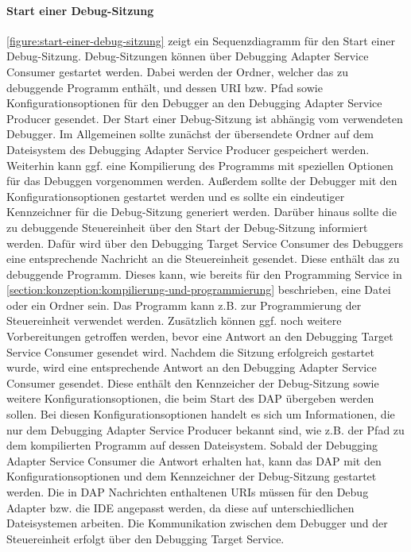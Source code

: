 \paragraph{Start einer Debug-Sitzung} \autoref{figure:start-einer-debug-sitzung} zeigt ein Sequenzdiagramm für den Start einer Debug-Sitzung. Debug-Sitzungen können über Debugging Adapter Service Consumer gestartet werden. Dabei werden der Ordner, welcher das zu debuggende Programm enthält, und dessen URI bzw. Pfad sowie Konfigurationsoptionen für den Debugger an den Debugging Adapter Service Producer gesendet. Der Start einer Debug-Sitzung ist abhängig vom verwendeten Debugger. Im Allgemeinen sollte zunächst der übersendete Ordner auf dem Dateisystem des Debugging Adapter Service Producer gespeichert werden. Weiterhin kann ggf. eine Kompilierung des Programms mit speziellen Optionen für das Debuggen vorgenommen werden. Außerdem sollte der Debugger mit den Konfigurationsoptionen gestartet werden und es sollte ein eindeutiger Kennzeichner für die Debug-Sitzung generiert werden. Darüber hinaus sollte die zu debuggende Steuereinheit über den Start der Debug-Sitzung informiert werden. Dafür wird über den Debugging Target Service Consumer des Debuggers eine entsprechende Nachricht an die Steuereinheit gesendet. Diese enthält das zu debuggende Programm. Dieses kann, wie bereits für den Programming Service in \autoref{section:konzeption:kompilierung-und-programmierung} beschrieben, eine Datei oder ein Ordner sein. Das Programm kann z.B. zur Programmierung der Steuereinheit verwendet werden. Zusätzlich können ggf. noch weitere Vorbereitungen getroffen werden, bevor eine Antwort an den Debugging Target Service Consumer gesendet wird. Nachdem die Sitzung erfolgreich gestartet wurde, wird eine entsprechende Antwort an den Debugging Adapter Service Consumer gesendet. Diese enthält den Kennzeicher der Debug-Sitzung sowie weitere Konfigurationsoptionen, die beim Start des \ac{DAP} übergeben werden sollen. Bei diesen Konfigurationsoptionen handelt es sich um Informationen, die nur dem Debugging Adapter Service Producer bekannt sind, wie z.B. der Pfad zu dem kompilierten Programm auf dessen Dateisystem. Sobald der Debugging Adapter Service Consumer die Antwort erhalten hat, kann das \ac{DAP} mit den Konfigurationsoptionen und dem Kennzeichner der Debug-Sitzung gestartet werden. Die in DAP Nachrichten enthaltenen URIs müssen für den Debug Adapter bzw. die IDE angepasst werden, da diese auf unterschiedlichen Dateisystemen arbeiten. Die Kommunikation zwischen dem Debugger und der Steuereinheit erfolgt über den Debugging Target Service.

